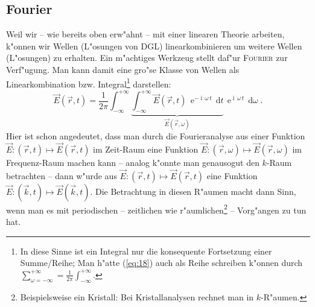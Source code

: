\documentclass[twoside,a4paper]{book}
\newcommand{\diff}{\ensuremath{\, \mathrm{d}}}
\newcommand{\E}{\ensuremath{\operatorname{e}}}
\newcommand{\I}{\ensuremath{\operatorname{i}}}
\begin{document}
\subsection{Fourier}
\label{kap_fourier}


Weil wir -- wie bereits oben erw"ahnt -- mit einer linearen Theorie
arbeiten, k"onnen wir Wellen (L"osungen von DGL) linearkombinieren um
weitere Wellen (L"osungen) zu erhalten. Ein m"achtiges Werkzeug stellt
daf"ur \textsc{Fourier} zur Verf"ugung. Man kann damit
eine gro"se Klasse von Wellen als Linearkombination
bzw. Integral\footnote{In diese Sinne ist ein Integral nur die
  konsequente Fortsetzung einer Summe/Reihe; Man h"atte (\ref{eq:18})
  auch als Reihe schreiben k"onnen durch $\sum_{\omega = -
    \infty}^{+\infty} = \frac{1}{2\pi} \int_{-\infty}^{+\infty}$.}
darstellen:
\begin{equation}
   \label{eq:18}
   \vec E(\vec r,t) 
= 
\frac{1}{2\pi} \int_{- \infty}^{+ \infty} 
\underbrace{ \int_{-\infty}^{+\infty} \vec E(\vec r,t) \, \E^{- \I
    \, \omega \, t} \diff t }_{\vec E(\vec r,\omega)} \, \E^{\I \, \omega \, t}
\diff \omega \;.
\end{equation}
Hier ist schon angedeutet, dass man durch die Fourieranalyse aus einer
Funktion $\vec E : (\vec r,t) \mapsto \vec E(\vec r,t)$ im Zeit-Raum
eine Funktion $\vec E : (\vec r,\omega) \mapsto \vec E(\vec r,\omega)$
im Frequenz-Raum machen kann -- analog k"onnte man genausogut den
$k$-Raum betrachten -- dann w"urde aus $\vec E : (\vec r,t) \mapsto
\vec E(\vec r,t)$ eine Funktion $\vec E : (\vec k,t) \mapsto \vec
E(\vec k,t)$. Die Betrachtung in diesen R"aumen macht dann Sinn, wenn
man es mit periodischen -- zeitlichen wie
r"aumlichen\footnote{Beispielsweise ein Kristall: Bei Kristallanalysen
  rechnet man in $k$-R"aumen.} -- Vorg"angen zu tun hat.
\end{document}
